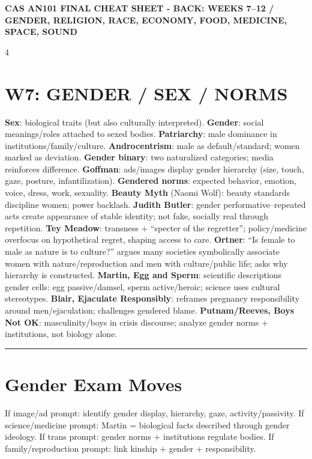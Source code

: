 \documentclass[10pt,landscape]{article}
\newcommand{\kw}[1]{\textbf{#1}}
\newcommand{\sep}{\vspace{0.8pt}\hrule\vspace{0.8pt}}
\begin{document}
\begin{center}\bfseries\fontsize{7}{7}\selectfont CAS AN101 FINAL CHEAT SHEET - BACK: WEEKS 7--12 / GENDER, RELIGION, RACE, ECONOMY, FOOD, MEDICINE, SPACE, SOUND\end{center}\vspace{-4pt}
\begin{multicols*}{4}

\section*{W7: GENDER / SEX / NORMS}
\kw{Sex}: biological traits (but also culturally interpreted). \kw{Gender}: social meanings/roles attached to sexed bodies. \kw{Patriarchy}: male dominance in institutions/family/culture. \kw{Androcentrism}: male as default/standard; women marked as deviation. \kw{Gender binary}: two naturalized categories; media reinforces difference. \kw{Goffman}: ads/images display gender hierarchy (size, touch, gaze, posture, infantilization). \kw{Gendered norms}: expected behavior, emotion, voice, dress, work, sexuality. \kw{Beauty Myth} (Naomi Wolf): beauty standards discipline women; power backlash. \kw{Judith Butler}: gender performative--repeated acts create appearance of stable identity; not fake, socially real through repetition. \kw{Tey Meadow}: transness + ``specter of the regretter''; policy/medicine overfocus on hypothetical regret, shaping access to care. \kw{Ortner}: ``Is female to male as nature is to culture?'' argues many societies symbolically associate women with nature/reproduction and men with culture/public life; asks why hierarchy is constructed. \kw{Martin, Egg and Sperm}: scientific descriptions gender cells: egg passive/damsel, sperm active/heroic; science uses cultural stereotypes. \kw{Blair, Ejaculate Responsibly}: reframes pregnancy responsibility around men/ejaculation; challenges gendered blame. \kw{Putnam/Reeves, Boys Not OK}: masculinity/boys in crisis discourse; analyze gender norms + institutions, not biology alone.
\sep
\section*{Gender Exam Moves}
If image/ad prompt: identify gender display, hierarchy, gaze, activity/passivity. If science/medicine prompt: Martin = biological facts described through gender ideology. If trans prompt: gender norms + institutions regulate bodies. If family/reproduction prompt: link kinship + gender + responsibility.


\end{multicols*}
\end{document}
